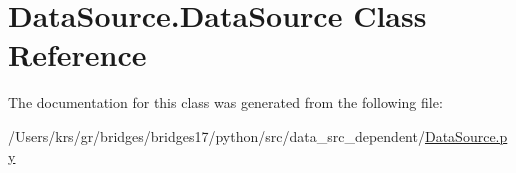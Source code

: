 \hypertarget{class_data_source_1_1_data_source}{}\section{Data\+Source.\+Data\+Source Class Reference}
\label{class_data_source_1_1_data_source}


The documentation for this class was generated from the following file\+:\begin{DoxyCompactItemize}
\item 
/\+Users/krs/gr/bridges/bridges17/python/src/data\+\_\+src\+\_\+dependent/\hyperlink{_data_source_8py}{Data\+Source.\+py}\end{DoxyCompactItemize}
